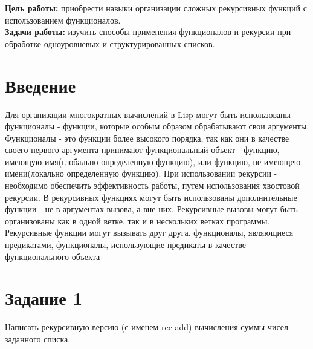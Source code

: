 \documentclass[a4paper, 12pt]{article}
\begin{document}
\tableofcontents
\clearpage
\newpage

\textbf{Цель работы:} приобрести навыки организации сложных рекурсивных функций с использованием функционалов.
\\ \hspace*{5mm} \textbf{Задачи работы:} изучить способы применения функционалов и рекурсии при обработке одноуровневых и структурированных списков.


\section*{Введение}

\hspace*{5mm} Для организации многократных вычислений в Lisp могут быть использованы функционалы - функции, которые особым образом обрабатывают свои аргументы. Функционалы - это  функции более высокого порядка, так как они в качестве своего первого аргумента принимают функциональный объект - функцию, имеющую имя(глобально определенную функцию), или функцию, не имеющею имени(локально определенную функцию). При использовании рекурсии - необходимо обеспечить эффективность работы, путем использования хвостовой рекурсии. В рекурсивных функциях могут быть использованы дополнительные функции - не в аргументах вызова, а вне них. Рекурсивные вызовы могут быть организованы как в одной ветке, так и в нескольких ветках программы. Рекурсивные функции могут вызывать друг друга.  функционалы, являющиеся предикатами, функционалы, использующие предикаты в качестве функционального объекта
\clearpage
\newpage




\lstset{style=mystyle}

\section*{Задание 1}
Написать рекурсивную версию (с именем rec-add) вычисления суммы чисел заданного списка.
\end{document}
